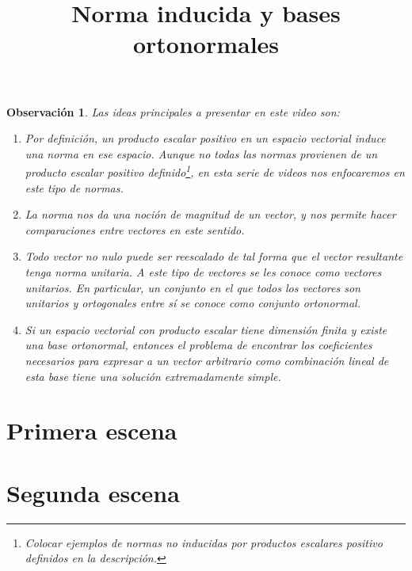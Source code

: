\documentclass[12pt,dvipsnames]{article}
\newtheorem{obs}{Observación}[section]
\numberwithin{equation}{section}
\begin{document}
\title{Norma inducida y bases ortonormales}
\date{}
\maketitle

\begin{obs}
    Las ideas principales a presentar en este video son:

    \begin{enumerate}[label=(\roman*)]
        \item Por definición, un producto escalar positivo en un espacio vectorial induce una norma en ese espacio. Aunque no todas las normas provienen de un producto escalar positivo definido\footnote{Colocar ejemplos de normas no inducidas por productos escalares positivo definidos en la descripción.}, en esta serie de videos nos enfocaremos en este tipo de normas.

        \item La norma nos da una noción de \emph{magnitud} de un vector, y nos permite hacer comparaciones entre vectores en este sentido.

        \item Todo vector no nulo puede ser reescalado de tal forma que el vector resultante tenga norma unitaria. A este tipo de vectores se les conoce como vectores unitarios. En particular, un conjunto en el que todos los vectores son unitarios y ortogonales entre sí se conoce como conjunto ortonormal.

        \item Si un espacio vectorial con producto escalar tiene dimensión finita y existe una base ortonormal, entonces el problema de encontrar los coeficientes necesarios para expresar a un vector arbitrario como combinación lineal de esta base tiene una solución extremadamente simple.
    \end{enumerate}
\end{obs}


\newpage
\section{Primera escena}


\newpage
\section{Segunda escena}
\end{document}
